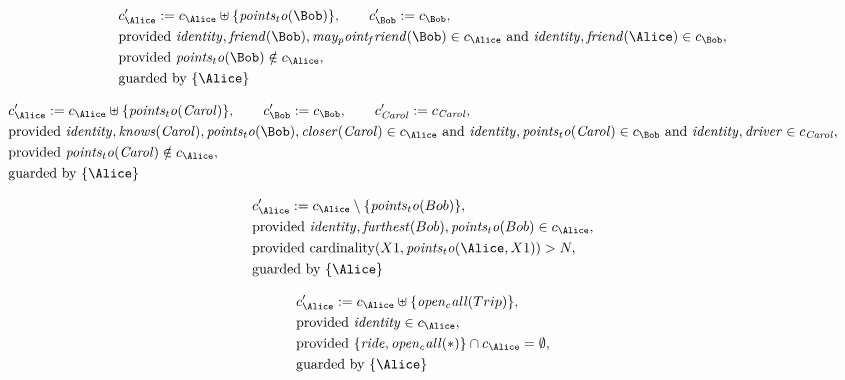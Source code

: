 \begin{align*}
&
c'_
{
\Alice
}
 := 
c_
{
\Alice
}
 \uplus 
\{
\mathit{
points_to
}
(
\Bob
)
\}
, \qquad 
c'_
{
\Bob
}
 := 
c_
{
\Bob
}
,\\
&
\text{provided } 
\mathit{
identity
}
,
\mathit{
friend
}
(
\Bob
)
,
\mathit{
may_point_friend
}
(
\Bob
)
 \in c_
{
\Alice
}
 \text{ and } 
\mathit{
identity
}
,
\mathit{
friend
}
(
\Alice
)
 \in c_
{
\Bob
}
,\\
&
\text{provided } 
\mathit{
points_to
}
(
\Bob
)
 \notin c_
{
\Alice
}
,\\
&
\text{guarded by } \{
\Alice
\}
\end{align*}

\begin{align*}
&
c'_
{
\Alice
}
 := 
c_
{
\Alice
}
 \uplus 
\{
\mathit{
points_to
}
(
\mathit{Carol}
)
\}
, \qquad 
c'_
{
\Bob
}
 := 
c_
{
\Bob
}
, \qquad 
c'_
{
\mathit{Carol}
}
 := 
c_
{
\mathit{Carol}
}
,\\
&
\text{provided } 
\mathit{
identity
}
,
\mathit{
knows
}
(
\mathit{Carol}
)
,
\mathit{
points_to
}
(
\Bob
)
,
\mathit{
closer
}
(
\mathit{Carol}
)
 \in c_
{
\Alice
}
 \text{ and } 
\mathit{
identity
}
,
\mathit{
points_to
}
(
\mathit{Carol}
)
 \in c_
{
\Bob
}
 \text{ and } 
\mathit{
identity
}
,
\mathit{
driver
}
 \in c_
{
\mathit{Carol}
}
,\\
&
\text{provided } 
\mathit{
points_to
}
(
\mathit{Carol}
)
 \notin c_
{
\Alice
}
,\\
&
\text{guarded by } \{
\Alice
\}
\end{align*}

\begin{align*}
&
c'_
{
\Alice
}
 := 
c_
{
\Alice
}
 \setminus 
\{
\mathit{
points_to
}
(
Bob
)
\}
,\\
&
\text{provided } 
\mathit{
identity
}
,
\mathit{
furthest
}
(
Bob
)
,
\mathit{
points_to
}
(
Bob
)
 \in c_
{
\Alice
}
,\\
&
\text{provided } 
\mathrm{cardinality}(
X1
,
\mathit{
points_to
}
(
\Alice
,
X1
)
)
>
N
,\\
&
\text{guarded by } \{
\Alice
\}
\end{align*}

\begin{align*}
&
c'_
{
\Alice
}
 := 
c_
{
\Alice
}
 \uplus 
\{
\mathit{
open_call
}
(
Trip
)
\}
,\\
&
\text{provided } 
\mathit{
identity
}
 \in c_
{
\Alice
}
,\\
&
\text{provided } 
\{
\mathit{
ride
}
,
\mathit{
open_call
}
(
\ast
)
\}
 \cap c_
{
\Alice
}
 = \emptyset
,\\
&
\text{guarded by } \{
\Alice
\}
\end{align*}
